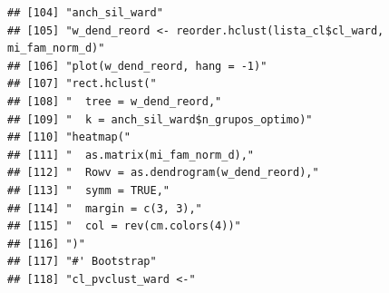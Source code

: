 \documentclass[11pt,]{article}
\begin{document}
\begin{verbatim}
## [104] "anch_sil_ward"                                                                                                                                                         
## [105] "w_dend_reord <- reorder.hclust(lista_cl$cl_ward, mi_fam_norm_d)"                                                                                                       
## [106] "plot(w_dend_reord, hang = -1)"                                                                                                                                         
## [107] "rect.hclust("                                                                                                                                                          
## [108] "  tree = w_dend_reord,"                                                                                                                                                
## [109] "  k = anch_sil_ward$n_grupos_optimo)"                                                                                                                                  
## [110] "heatmap("                                                                                                                                                              
## [111] "  as.matrix(mi_fam_norm_d),"                                                                                                                                           
## [112] "  Rowv = as.dendrogram(w_dend_reord),"                                                                                                                                 
## [113] "  symm = TRUE,"                                                                                                                                                        
## [114] "  margin = c(3, 3),"                                                                                                                                                   
## [115] "  col = rev(cm.colors(4))"                                                                                                                                             
## [116] ")"                                                                                                                                                                     
## [117] "#' Bootstrap"                                                                                                                                                          
## [118] "cl_pvclust_ward <-"                                                                                                                                                    

\end{verbatim}
\end{document}

